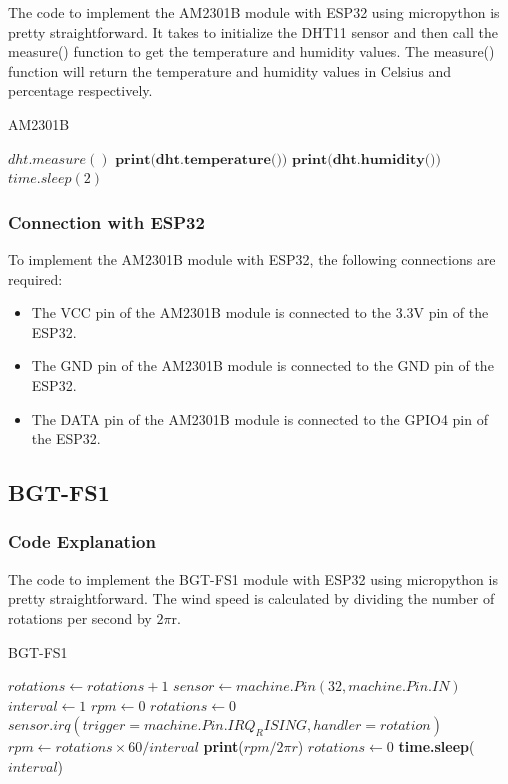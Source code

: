\documentclass{report}
\begin{document}
The code to implement the AM2301B module with ESP32 using micropython is pretty straightforward. It takes to initialize the DHT11 sensor and then call the measure() function to get the temperature and humidity values. The measure() function will return the temperature and humidity values in Celsius and percentage respectively\cite{am0}.

\begin{algorithm}
\caption{AM2301B}
\begin{algorithmic}[1]
\State $dht.measure()$
\State $\textbf{print(dht.temperature())}$
\State $\textbf{print(dht.humidity())}$
\State $time.sleep(2)$
\EndProcedure
\end{algorithmic}
\end{algorithm}

\subsubsection{Connection with ESP32}
To implement the AM2301B module with ESP32, the following connections are required:
\begin{itemize}
    \item The VCC pin of the AM2301B module is connected to the 3.3V pin of the ESP32. 
    \item The GND pin of the AM2301B module is connected to the GND pin of the ESP32.
    \item The DATA pin of the AM2301B module is connected to the GPIO4 pin of the ESP32.
\end{itemize}

\subsection{BGT-FS1}
\subsubsection{Code Explanation}

The code to implement the BGT-FS1 module with ESP32 using micropython is pretty straightforward. The wind speed is calculated by dividing the number of rotations per second by $2\pi$r. 


\begin{algorithm}
\caption{BGT-FS1}
\begin{algorithmic}[1]
\State $rotations \gets rotations + 1$
\EndProcedure
\State $sensor \gets machine.Pin(32, machine.Pin.IN)$
\State $interval \gets 1$
\State $rpm \gets 0$
\State $rotations \gets 0$
\State $sensor.irq(trigger=machine.Pin.IRQ_RISING, handler=rotation)$
\State $rpm \gets rotations \times 60 / interval$
\State \textbf{print}($rpm/2\pi r$)
\State $rotations \gets 0$
\State \textbf{time.sleep}($interval$)
\EndWhile
\end{algorithmic}
\end{algorithm}
\end{document}
